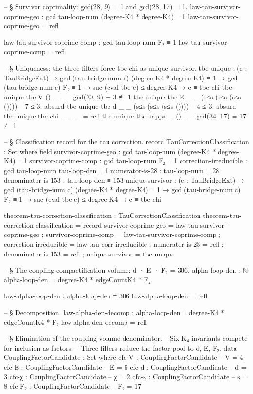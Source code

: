 \documentclass[11pt,a4paper]{book}
\begin{document}
\begin{code}
-- § Survivor coprimality: gcd(28, 9) = 1 and gcd(28, 17) = 1.
law-tau-survivor-coprime-geo : gcd tau-loop-num (degree-K4 * degree-K4) ≡ 1
law-tau-survivor-coprime-geo = refl

law-tau-survivor-coprime-comp : gcd tau-loop-num F₂ ≡ 1
law-tau-survivor-coprime-comp = refl

-- § Uniqueness: the three filters force tbe-chi as unique survivor.
tbe-unique :
  (c : TauBridgeExt) →
  gcd (tau-bridge-num c) (degree-K4 * degree-K4) ≡ 1 →
  gcd (tau-bridge-num c) F₂ ≡ 1 →
  suc (eval-tbe c) ≤ degree-K4 →
  c ≡ tbe-chi
tbe-unique tbe-V     () _  _                         -- gcd(30, 9) = 3 ≢ 1
tbe-unique tbe-E     _  _  (s≤s (s≤s (s≤s ())))      -- 7 ≤ 3: absurd
tbe-unique tbe-d     _  _  (s≤s (s≤s (s≤s ())))      -- 4 ≤ 3: absurd
tbe-unique tbe-chi   _  _  _  = refl
tbe-unique tbe-kappa _  () _                          -- gcd(34, 17) = 17 ≢ 1

-- § Classification record for the tau correction.
record TauCorrectionClassification : Set where
  field
    survivor-coprime-geo  : gcd tau-loop-num (degree-K4 * degree-K4) ≡ 1
    survivor-coprime-comp : gcd tau-loop-num F₂ ≡ 1
    correction-irreducible : gcd tau-loop-num tau-loop-den ≡ 1
    numerator-is-28   : tau-loop-num ≡ 28
    denominator-is-153 : tau-loop-den ≡ 153
    unique-survivor :
      (c : TauBridgeExt) →
      gcd (tau-bridge-num c) (degree-K4 * degree-K4) ≡ 1 →
      gcd (tau-bridge-num c) F₂ ≡ 1 →
      suc (eval-tbe c) ≤ degree-K4 →
      c ≡ tbe-chi

theorem-tau-correction-classification : TauCorrectionClassification
theorem-tau-correction-classification = record
  { survivor-coprime-geo  = law-tau-survivor-coprime-geo
  ; survivor-coprime-comp = law-tau-survivor-coprime-comp
  ; correction-irreducible = law-tau-corr-irreducible
  ; numerator-is-28   = refl
  ; denominator-is-153 = refl
  ; unique-survivor = tbe-unique
  }

-- § The coupling-compactification volume: d · E · F₂ = 306.
alpha-loop-den : ℕ
alpha-loop-den = degree-K4 * edgeCountK4 * F₂

law-alpha-loop-den : alpha-loop-den ≡ 306
law-alpha-loop-den = refl

-- § Decomposition.
law-alpha-den-decomp : alpha-loop-den ≡ degree-K4 * edgeCountK4 * F₂
law-alpha-den-decomp = refl

-- § Elimination of the coupling-volume denominator.
-- Six K₄ invariants compete for inclusion as factors.
-- Three filters reduce the factor pool to {d, E, F₂}.
data CouplingFactorCandidate : Set where
  cfc-V  : CouplingFactorCandidate   -- V = 4
  cfc-E  : CouplingFactorCandidate   -- E = 6
  cfc-d  : CouplingFactorCandidate   -- d = 3
  cfc-χ  : CouplingFactorCandidate   -- χ = 2
  cfc-κ  : CouplingFactorCandidate   -- κ = 8
  cfc-F₂ : CouplingFactorCandidate   -- F₂ = 17


\end{code}
\end{document}

